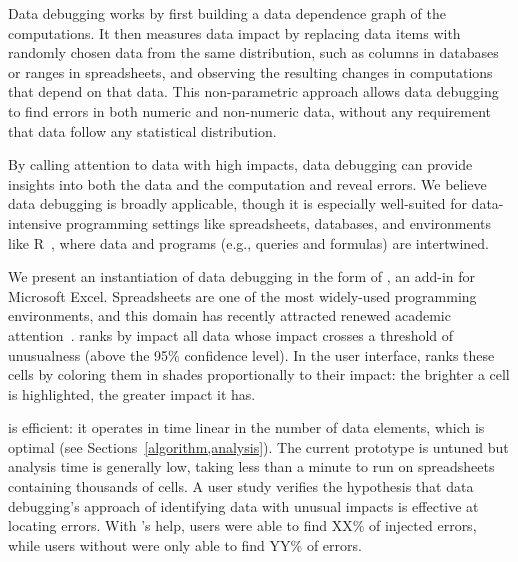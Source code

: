 Data debugging works by first building a data dependence graph of the
computations. It then measures data impact by replacing data items
with randomly chosen data from the same distribution, such as columns
in databases or ranges in spreadsheets, and observing the resulting
changes in computations that depend on that data. This non-parametric
approach allows data debugging to find errors in both numeric and
non-numeric data, without any requirement that data follow any
statistical distribution.

By calling attention to data with high impacts, data
debugging can provide insights into both the data and the computation
and reveal errors. We believe data debugging is broadly applicable, though it is
especially well-suited for data-intensive programming settings
like spreadsheets, databases, and environments like
R~\cite{ihaka1996r}, where data and programs (e.g., queries and
formulas) are intertwined.

We present an instantiation of data debugging in the form
of \checkcell{}, an add-in for Microsoft Excel. Spreadsheets are one
of the most widely-used programming environments, and this domain has
recently attracted renewed academic
attention~\cite{DBLP:conf/popl/Gulwani11,DBLP:conf/pldi/HarrisG11,Singh:2012:LSS:2212351.2212356}.
\checkcell{} ranks by impact all data whose
impact crosses a threshold of unusualness (above the 95\% confidence
level).  In the user interface, \checkcell{} ranks these cells by coloring them in
shades proportionally to their impact: the brighter a cell is
highlighted, the greater impact it has.

\checkcell{} is efficient: it operates in time linear in the number
of data elements, which is optimal (see
Sections~\ref{algorithm,analysis}). The current prototype is untuned
but analysis time is generally low, taking less than a minute to run
on spreadsheets containing thousands of cells. A user study verifies
the hypothesis that data debugging's approach of identifying data with
unusual impacts is effective at locating errors. With \checkcell{}'s
help, users were able to find XX\% of injected errors, while users
without \checkcell{} were only able to find YY\% of errors.


